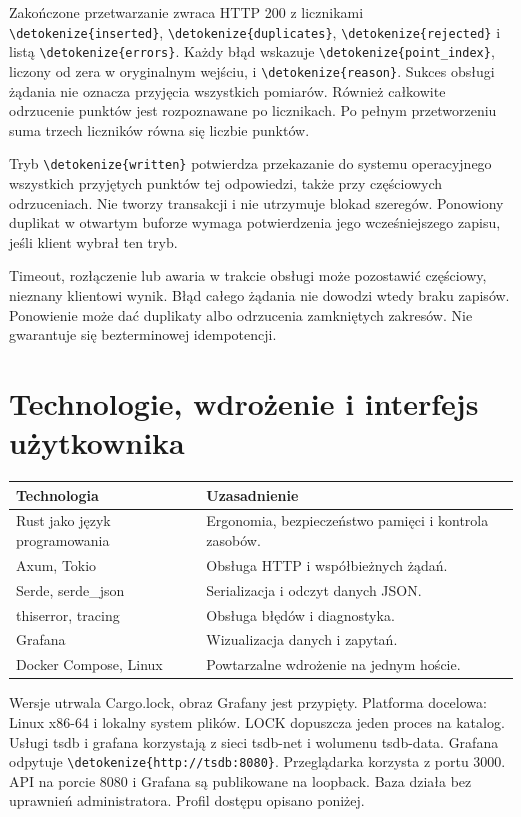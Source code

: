 \documentclass[11pt,a4paper]{article}
\newcommand{\code}[1]{\expandafter\nolinkurl\expandafter{\detokenize{#1}}}
\begin{document}
Zakończone przetwarzanie zwraca HTTP 200 z licznikami \code{inserted},
\code{duplicates}, \code{rejected} i listą \code{errors}. Każdy błąd wskazuje
\code{point_index}, liczony od zera w oryginalnym wejściu, i \code{reason}.
Sukces obsługi żądania nie oznacza przyjęcia wszystkich pomiarów. Również
całkowite odrzucenie punktów jest rozpoznawane po licznikach.
Po pełnym przetworzeniu suma trzech liczników równa się liczbie punktów.

Tryb \code{written} potwierdza przekazanie do systemu operacyjnego
wszystkich przyjętych punktów tej odpowiedzi, także przy częściowych
odrzuceniach. Nie tworzy transakcji i nie utrzymuje blokad szeregów.
Ponowiony duplikat w otwartym buforze wymaga potwierdzenia jego
wcześniejszego zapisu, jeśli klient wybrał ten tryb.

Timeout, rozłączenie lub awaria w trakcie obsługi może pozostawić
częściowy, nieznany klientowi wynik. Błąd całego żądania nie dowodzi
wtedy braku zapisów. Ponowienie może dać duplikaty albo odrzucenia
zamkniętych zakresów. Nie gwarantuje się bezterminowej idempotencji.

\section{Technologie, wdrożenie i interfejs użytkownika}
\label{sec:technology}
\label{sec:network}
\par
\begin{tabularx}{\linewidth}{P{65mm}Y}
  \toprule
  Technologia                   & Uzasadnienie                                          \\ \midrule
  Rust jako język programowania & Ergonomia, bezpieczeństwo pamięci i kontrola zasobów. \\
  Axum, Tokio                   & Obsługa HTTP i współbieżnych żądań.                   \\
  Serde, serde\_json            & Serializacja i odczyt danych JSON.                    \\
  thiserror, tracing            & Obsługa błędów i diagnostyka.                         \\
  Grafana                       & Wizualizacja danych i zapytań.                        \\
  Docker Compose, Linux         & Powtarzalne wdrożenie na jednym hoście.               \\
  \bottomrule
\end{tabularx}

Wersje utrwala Cargo.lock, obraz Grafany jest przypięty.
Platforma docelowa: Linux x86-64 i lokalny system plików.
LOCK dopuszcza jeden proces na katalog. Usługi tsdb i grafana
korzystają z sieci tsdb-net i wolumenu tsdb-data.
Grafana odpytuje \code{http://tsdb:8080}. Przeglądarka korzysta
z portu 3000. API na porcie 8080 i Grafana są publikowane na loopback.
Baza działa bez uprawnień administratora. Profil dostępu opisano poniżej.
\end{document}
